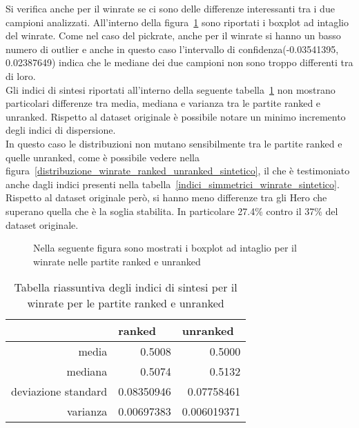 Si verifica anche per il winrate se ci sono delle differenze interessanti tra i due campioni analizzati. All'interno della figura~\ref{boxplot_winrate_sintetico} sono riportati i boxplot ad intaglio del winrate. Come nel caso del pickrate, anche per il winrate si hanno un basso numero di outlier e anche in questo caso l'intervallo di confidenza(-0.03541395, 0.02387649) indica che le mediane dei due campioni non sono troppo differenti tra di loro. \\
Gli indici di sintesi riportati all'interno della seguente tabella~\ref{indici_sintesi_winrate_sintetico} non mostrano particolari differenze tra media, mediana e varianza tra le partite ranked e unranked. Rispetto al dataset originale è possibile notare un minimo incremento degli indici di dispersione. \\
In questo caso le distribuzioni non mutano sensibilmente tra le partite ranked e quelle unranked, come è possibile vedere nella figura~\ref{distribuzione_winrate_ranked_unranked_sintetico}, il che è testimoniato anche dagli indici presenti nella tabella~\ref{indici_simmetrici_winrate_sintetico}. Rispetto al dataset originale però, si hanno meno differenze tra gli Hero che superano quella che è la soglia stabilita. In particolare 27.4\% contro il 37\% del dataset originale. \\
\begin{figure}[htbp]
\begin{center}

\caption{Nella seguente figura sono mostrati i boxplot ad intaglio per il winrate nelle partite ranked e unranked}
\label{boxplot_winrate_sintetico}
\end{center}
\end{figure}
\begin{table}
\centering
\caption{Tabella riassuntiva degli indici di sintesi per il winrate per le partite ranked e unranked}
\label{indici_sintesi_winrate_sintetico}
\begin{tabular}{|r|r|r|}
\hline
\multicolumn{1}{|l|}{} & \multicolumn{1}{l|}{ranked} & \multicolumn{1}{l|}{unranked} \\ \hline
media               &  0.5008  &   0.5000 \\ \hline
mediana             &  0.5074  &  0.5132 \\ \hline
deviazione standard & 0.08350946  &   0.07758461 \\ \hline
varianza            &  0.00697383  &   0.006019371 \\ \hline
\end{tabular}
\end{table}
